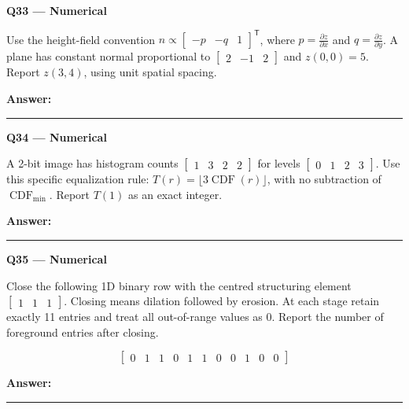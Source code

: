 \documentclass[11pt,a4paper]{article}
\begin{document}
\begin{minipage}{\linewidth}
\textbf{Q33 — Numerical}\par\smallskip
Use the height-field convention \(n\propto\begin{bmatrix}-p&-q&1\end{bmatrix}^{\mathsf T}\),\allowbreak{} where \(p=\frac{\partial z}{\partial x}\) and \(q=\frac{\partial z}{\partial y}\). A plane has constant normal proportional to \(\begin{bmatrix}2&-1&2\end{bmatrix}\) and \(z(0,0)=5\). Report \(z(3,4)\),\allowbreak{} using unit spatial spacing.
\par\medskip\textbf{Answer:} \rule{55mm}{0.4pt}
\end{minipage}
\par\vspace{12pt}
\begin{minipage}{\linewidth}
\textbf{Q34 — Numerical}\par\smallskip
A 2-bit image has histogram counts \(\begin{bmatrix}1&3&2&2\end{bmatrix}\) for levels \(\begin{bmatrix}0&1&2&3\end{bmatrix}\). Use this specific equalization rule: \(T(r)=\lfloor3\operatorname{CDF}(r)\rfloor\),\allowbreak{} with no subtraction of \(\operatorname{CDF}_{\min}\). Report \(T(1)\) as an exact integer.
\par\medskip\textbf{Answer:} \rule{55mm}{0.4pt}
\end{minipage}
\par\vspace{12pt}
\begin{minipage}{\linewidth}
\textbf{Q35 — Numerical}\par\smallskip
Close the following 1D binary row with the centred structuring element \(\begin{bmatrix}1&1&1\end{bmatrix}\). Closing means dilation followed by erosion. At each stage retain exactly 11 entries and treat all out-of-range values as 0. Report the number of foreground entries after closing.


\[
\begin{bmatrix}0&1&1&0&1&1&0&0&1&0&0\end{bmatrix}
\]

\par\medskip\textbf{Answer:} \rule{55mm}{0.4pt}
\end{minipage}
\end{document}
